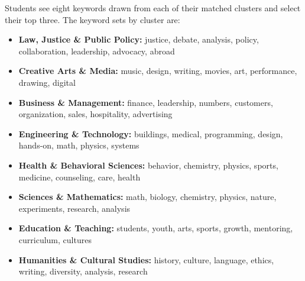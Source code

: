 Students see eight keywords drawn from each of their matched clusters and select their top three. The keyword sets by cluster are:

\begin{itemize}
    \item \textbf{Law, Justice \& Public Policy:} justice, debate, analysis, policy, collaboration, leadership, advocacy, abroad
    \item \textbf{Creative Arts \& Media:} music, design, writing, movies, art, performance, drawing, digital
    \item \textbf{Business \& Management:} finance, leadership, numbers, customers, organization, sales, hospitality, advertising
    \item \textbf{Engineering \& Technology:} buildings, medical, programming, design, hands-on, math, physics, systems
    \item \textbf{Health \& Behavioral Sciences:} behavior, chemistry, physics, sports, medicine, counseling, care, health
    \item \textbf{Sciences \& Mathematics:} math, biology, chemistry, physics, nature, experiments, research, analysis
    \item \textbf{Education \& Teaching:} students, youth, arts, sports, growth, mentoring, curriculum, cultures
    \item \textbf{Humanities \& Cultural Studies:} history, culture, language, ethics, writing, diversity, analysis, research
\end{itemize}
